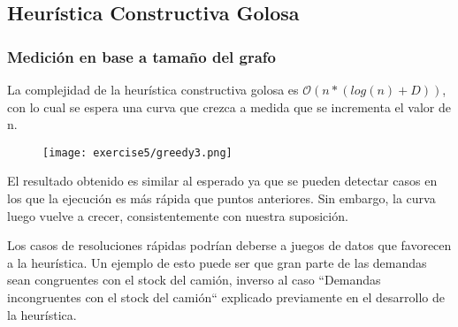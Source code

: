 \subsection{Heurística Constructiva Golosa}

\subsubsection{Medición en base a tamaño del grafo}
La complejidad de la heurística constructiva golosa es $\mathcal{O}(n * (log(n) + D))$, con lo cual se espera una curva que crezca a medida que se incrementa el valor de n.

\begin{figure}[H]
	\centering
	\texttt{[image: exercise5/greedy3.png]}
\end{figure}

El resultado obtenido es similar al esperado ya que se pueden detectar casos en los que la ejecución es más rápida que puntos anteriores. Sin embargo, la curva luego vuelve a crecer, consistentemente con nuestra suposición. 

Los casos de resoluciones rápidas podrían deberse a juegos de datos que favorecen a la heurística. Un ejemplo de esto puede ser que gran parte de las demandas sean congruentes con el stock del camión, inverso al caso ``Demandas incongruentes con el stock del camión`` explicado previamente en el desarrollo de la heurística.